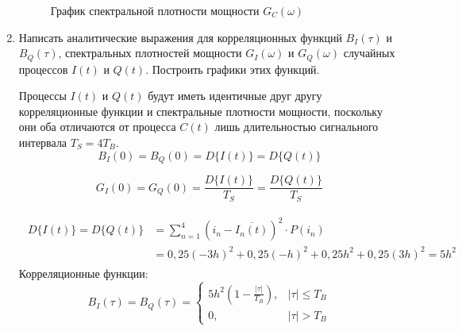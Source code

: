 \documentclass[a4paper, 12pt]{article}
\begin{document}
\begin{enumerate}
  \begin{figure}[H]
    \centering
    \caption{График спектральной плотности мощности 
    $G_C(\omega)$}
  \end{figure}

  \item Написать аналитические выражения для 
  корреляционных функций $B_I(\tau)$ и $B_Q(\tau)$, 
  спектральных плотностей мощности $G_I(\omega)$ 
  и $G_Q(\omega)$ случайных процессов $I(t)$ и $Q(t)$. 
  Построить графики этих функций.

  Процессы $I(t)$ и $Q(t)$ будут иметь идентичные друг другу корреляционные функции и спектральные плотности 
  мощности, поскольку они оба отличаются от процесса 
  $C(t)$ лишь длительностью сигнального интервала 
  $T_S=4T_B$.
  \begin{equation}
    B_I(0)=B_Q(0)=D\{I(t)\}=D\{Q(t)\} 
  \end{equation}

  \begin{equation}
    G_I(0)=G_Q(0)=\frac{D\{I(t)\}}{T_S}=\frac{D\{Q(t)\}}{T_S} 
  \end{equation}

  \begin{align}\begin{split}
    D\{I(t)\}=D\{Q(t)\}&
    =\sum^4_{n=1}(i_n-\overline{I_n(t)})^2\cdot P(i_n)\\
    &=0,25(-3h)^2+0,25(-h)^2+0,25h^2+0,25(3h)^2=5h^2
  \end{split}\end{align}
  Корреляционные функции:
  \begin{equation}
    B_I(\tau)=B_Q(\tau)=\begin{cases}
      5h^2(1-\frac{|\tau|}{T_B}), & |\tau|\leq T_B\\
      0, & |\tau| > T_B
    \end{cases} 
  \end{equation}


\end{enumerate}
\end{document}
